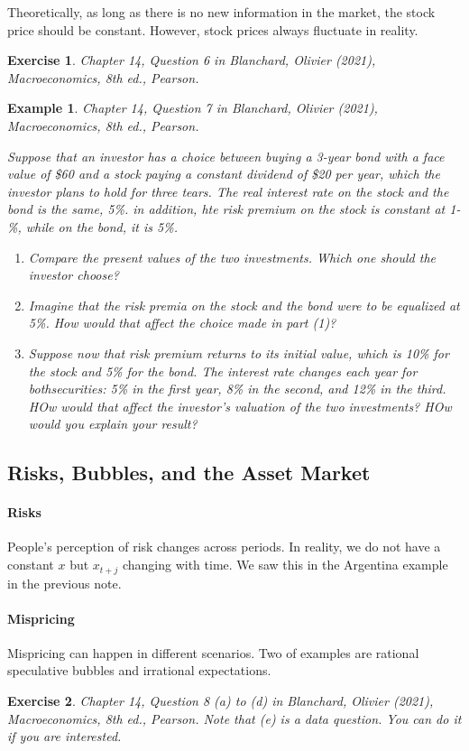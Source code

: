\documentclass[12pt]{article}
\newtheorem{example}{Example}
\newtheorem{exercise}{Exercise}
\begin{document}
Theoretically, as long as there is no new information in the market, the stock price should be constant. However, stock prices always fluctuate in reality. 

\begin{exercise}
    Chapter 14, Question 6 in Blanchard, Olivier (2021), \textit{Macroeconomics}, 8th ed., Pearson.
\end{exercise}

\begin{example}
    Chapter 14, Question 7 in Blanchard, Olivier (2021), \textit{Macroeconomics}, 8th ed., Pearson.

    Suppose that an investor has a choice between buying a 3-year bond with a face value of \$60 and a stock paying a constant dividend of \$20 per year, which the investor plans to hold for three tears. The real interest rate on the stock and the bond is the same, 5\%. in addition, hte risk premium on the stock is constant at 1-\%, while on the bond, it is 5\%.
    \begin{enumerate}[label=(\arabic*)]
        \item Compare the present values of the two investments. Which one should the investor choose?
        \item Imagine that the risk premia on the stock and the bond were to be equalized at 5\%. How would that affect the choice made in part (1)?
        \item Suppose now that risk premium returns to its initial value, which is 10\% for the stock and 5\% for the bond. The interest rate changes each year for bothsecurities: 5\% in the first year, 8\% in the second, and 12\% in the third. HOw would that affect the investor's valuation of the two investments? HOw would you explain your result?
    \end{enumerate}
\end{example}

\subsection*{Risks, Bubbles, and the Asset Market}
\paragraph{Risks} People's perception of risk changes across periods. In reality, we do not have a constant $x$ but $x_{t+j}$ changing with time. We saw this in the Argentina example in the previous note.

\paragraph{Mispricing} Mispricing can happen in different scenarios. Two of examples are rational speculative bubbles and irrational expectations.

\begin{exercise}
    Chapter 14, Question 8 (a) to (d) in Blanchard, Olivier (2021), \textit{Macroeconomics}, 8th ed., Pearson. Note that (e) is a data question. You can do it if you are interested.
\end{exercise}
\end{document}
